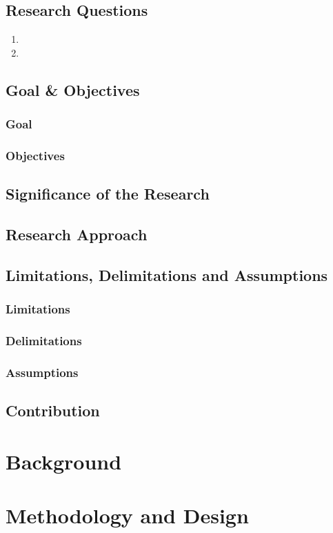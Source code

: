 \documentclass[12pt,a4paper]{report}
\begin{document}
\section{Research Questions}
\begin{enumerate}
    \item 
    \item
\end{enumerate}
\section{Goal \& Objectives}
\subsection{Goal}
\subsection{Objectives}
\section{Significance of the Research}
\section{Research Approach}
\section{Limitations, Delimitations and Assumptions}
\subsection{Limitations}
\subsection{Delimitations}
\subsection{Assumptions}
\section{Contribution}

\chapter{Background}

\chapter{Methodology and Design}
\end{document}

